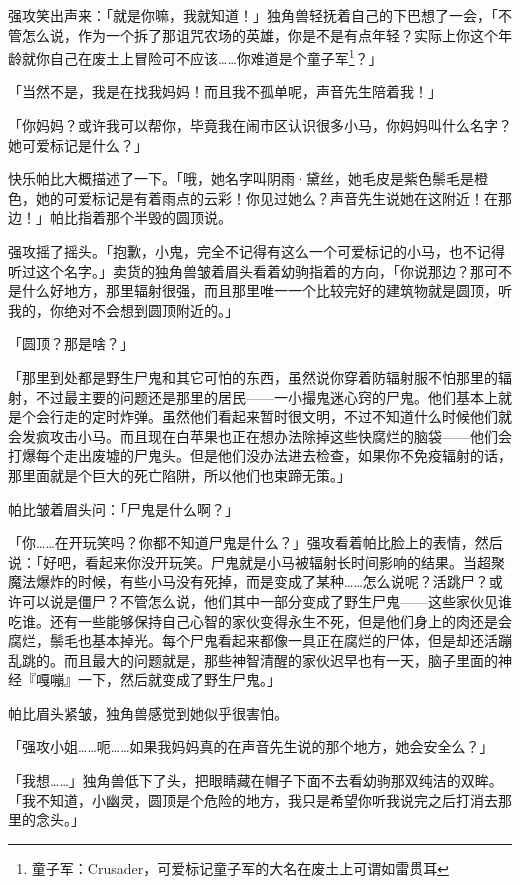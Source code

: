 强攻笑出声来：「就是你嘛，我就知道！」独角兽轻抚着自己的下巴想了一会，「不管怎么说，作为一个拆了那诅咒农场的英雄，你是不是有点年轻？实际上你这个年龄就你自己在废土上冒险可不应该……你难道是个童子军\footnote{童子军：Crusader，可爱标记童子军的大名在废土上可谓如雷贯耳}？」

「当然不是，我是在找我妈妈！而且我不孤单呢，声音先生陪着我！」

「你妈妈？或许我可以帮你，毕竟我在闹市区认识很多小马，你妈妈叫什么名字？她可爱标记是什么？」

快乐帕比大概描述了一下。「哦，她名字叫阴雨·黛丝，她毛皮是紫色鬃毛是橙色，她的可爱标记是有着雨点的云彩！你见过她么？声音先生说她在这附近！在那边！」帕比指着那个半毁的圆顶说。

强攻摇了摇头。「抱歉，小鬼，完全不记得有这么一个可爱标记的小马，也不记得听过这个名字。」卖货的独角兽皱着眉头看着幼驹指着的方向，「你说那边？那可不是什么好地方，那里辐射很强，而且那里唯一一个比较完好的建筑物就是圆顶，听我的，你绝对不会想到圆顶附近的。」

「圆顶？那是啥？」

「那里到处都是野生尸鬼和其它可怕的东西，虽然说你穿着防辐射服不怕那里的辐射，不过最主要的问题还是那里的居民——一小撮鬼迷心窍的尸鬼。他们基本上就是个会行走的定时炸弹。虽然他们看起来暂时很文明，不过不知道什么时候他们就会发疯攻击小马。而且现在白苹果也正在想办法除掉这些快腐烂的脑袋——他们会打爆每个走出废墟的尸鬼头。但是他们没办法进去检查，如果你不免疫辐射的话，那里面就是个巨大的死亡陷阱，所以他们也束蹄无策。」

帕比皱着眉头问：「尸鬼是什么啊？」

「你……在开玩笑吗？你都不知道尸鬼是什么？」强攻看着帕比脸上的表情，然后说：「好吧，看起来你没开玩笑。尸鬼就是小马被辐射长时间影响的结果。当超聚魔法爆炸的时候，有些小马没有死掉，而是变成了某种……怎么说呢？活跳尸？或许可以说是僵尸？不管怎么说，他们其中一部分变成了野生尸鬼——这些家伙见谁吃谁。还有一些能够保持自己心智的家伙变得永生不死，但是他们身上的肉还是会腐烂，鬃毛也基本掉光。每个尸鬼看起来都像一具正在腐烂的尸体，但是却还活蹦乱跳的。而且最大的问题就是，那些神智清醒的家伙迟早也有一天，脑子里面的神经『嘎嘣』一下，然后就变成了野生尸鬼。」

帕比眉头紧皱，独角兽感觉到她似乎很害怕。

「强攻小姐……呃……如果我妈妈真的在声音先生说的那个地方，她会安全么？」

「我想……」独角兽低下了头，把眼睛藏在帽子下面不去看幼驹那双纯洁的双眸。「我不知道，小幽灵，圆顶是个危险的地方，我只是希望你听我说完之后打消去那里的念头。」

